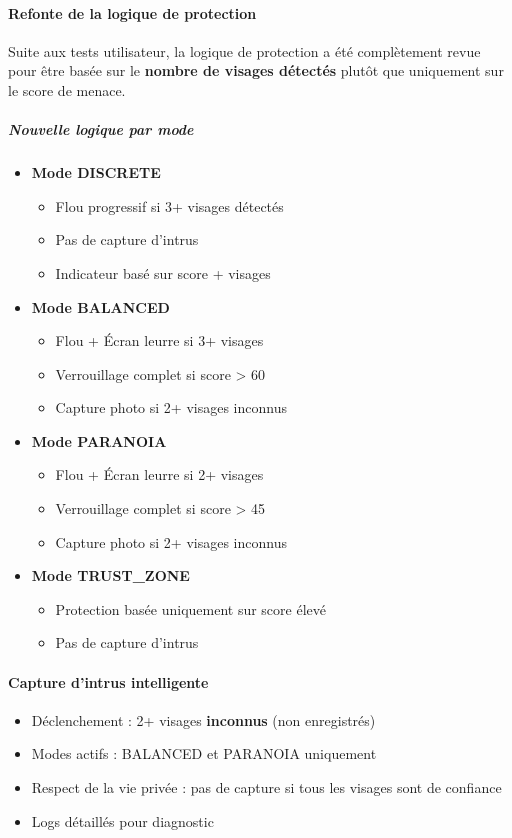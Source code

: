 \documentclass[11pt,a4paper]{article}
\begin{document}
\paragraph{Refonte de la logique de protection}
Suite aux tests utilisateur, la logique de protection a été complètement revue pour être basée sur le \textbf{nombre de visages détectés} plutôt que uniquement sur le score de menace.

\subparagraph{Nouvelle logique par mode}
\begin{itemize}
    \item \textbf{Mode DISCRETE}
    \begin{itemize}
        \item Flou progressif si 3+ visages détectés
        \item Pas de capture d'intrus
        \item Indicateur basé sur score + visages
    \end{itemize}
    
    \item \textbf{Mode BALANCED}
    \begin{itemize}
        \item Flou + Écran leurre si 3+ visages
        \item Verrouillage complet si score > 60
        \item Capture photo si 2+ visages inconnus
    \end{itemize}
    
    \item \textbf{Mode PARANOIA}
    \begin{itemize}
        \item Flou + Écran leurre si 2+ visages
        \item Verrouillage complet si score > 45
        \item Capture photo si 2+ visages inconnus
    \end{itemize}
    
    \item \textbf{Mode TRUST\_ZONE}
    \begin{itemize}
        \item Protection basée uniquement sur score élevé
        \item Pas de capture d'intrus
    \end{itemize}
\end{itemize}

\paragraph{Capture d'intrus intelligente}
\begin{itemize}
    \item Déclenchement : 2+ visages \textbf{inconnus} (non enregistrés)
    \item Modes actifs : BALANCED et PARANOIA uniquement
    \item Respect de la vie privée : pas de capture si tous les visages sont de confiance
    \item Logs détaillés pour diagnostic
\end{itemize}
\end{document}
